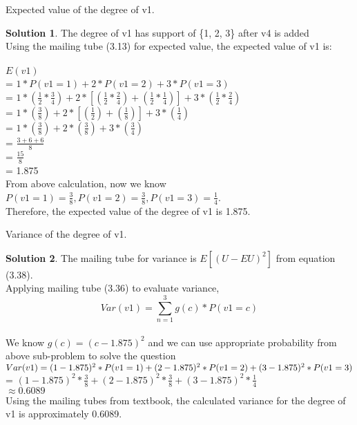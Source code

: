\documentclass[paper=a4, fontsize=11pt]{scrartcl} %
\numberwithin{equation}{section} %
\numberwithin{figure}{section} %
\numberwithin{table}{section} %
\theoremstyle{definition}
\newtheorem*{solution}{Solution}
\begin{document}
    Expected value of the degree of v1.
    \begin{solution} 
        The degree of v1 has support of \{1, 2, 3\} after v4 is added\\
        Using the mailing tube (3.13) for expected value, the expected value of v1 is:\\\\
        $E(v1)$\\
        = $1*P(v1 = 1) + 2*P(v1 = 2) + 3*P(v1 = 3)$\\
        = $1 * (\frac{1}{2} * \frac{3}{4}) + 
        2 * [(\frac{1}{2} * \frac{2}{4}) + (\frac{1}{2} * \frac{1}{4})] + 3 * (\frac{1}{2} * \frac{2}{4})$\\
        = $1 * (\frac{3}{8}) +
        2 * [(\frac{1}{2}) + (\frac{1}{8})] + 3 * (\frac{1}{4})$\\
        = $1 * (\frac{3}{8}) +
        2 * (\frac{3}{8}) + 3 * (\frac{3}{4})$\\
        = $\frac{3+6+6}{8}$\\
        = $\frac{15}{8}$\\
        = 1.875\\
        From above calculation, now we know $P(v1 = 1) = \frac{3}{8},
         P(v1 = 2) = \frac{3}{8},
         P(v1 = 3) = \frac{1}{4}$.\\
        Therefore, the expected value of the degree of v1 is 1.875.
    \end{solution}
    
    Variance of the degree of v1.
    \begin{solution} 
    The mailing tube for variance is $E[(U - EU)^2]$ from equation  (3.38).\\
    Applying mailing tube (3.36) to evaluate variance, $$Var(v1) = \sum_{n=1}^{3} g(c) * P(v1 = c)$$\\
    We know $g(c) = (c - 1.875)^2$ and we can use appropriate probability from above sub-problem to solve the question\\
    $Var(v1)\\
    = (1 - 1.875)^2 * P(v1 = 1) + 
    (2 - 1.875)^2 * P(v1 = 2) +
    (3 - 1.875)^2 * P(v1 = 3)$\\
    = $(1 - 1.875)^2 * \frac{3}{8} + 
    (2 - 1.875)^2 * \frac{3}{8} +
    (3 - 1.875)^2 * \frac{1}{4}$\\
    $\approx  0.6089$\\
    Using the mailing tubes from textbook, the calculated variance for the degree of v1 is approximately 0.6089.
    \end{solution}
    
\end{document}
